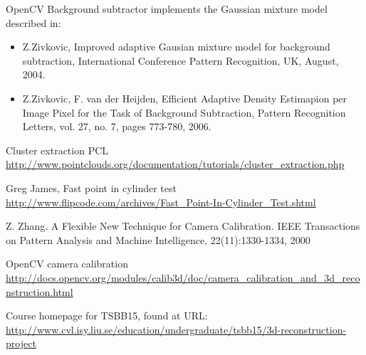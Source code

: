 \documentclass[10pt,a4paper]{article}
\begin{document}



\pagebreak
\tableofcontents
\newpage












	



\begin{thebibliography}{9}

OpenCV Background subtractor implements the Gaussian mixture model described in:
\begin{itemize}
\item Z.Zivkovic, Improved adaptive Gausian mixture model for background subtraction, International Conference Pattern Recognition, UK, August, 2004.
\item Z.Zivkovic, F. van der Heijden, Efficient Adaptive Density Estimapion per Image Pixel for the Task of Background Subtraction, Pattern Recognition Letters, vol. 27, no. 7, pages 773-780, 2006. 
\end{itemize}

Cluster extraction PCL\\
\url{http://www.pointclouds.org/documentation/tutorials/cluster_extraction.php}

Greg James, Fast point in cylinder test\\
\url{http://www.flipcode.com/archives/Fast_Point-In-Cylinder_Test.shtml}

Z. Zhang. A Flexible New Technique for Camera Calibration. IEEE Transactions on Pattern Analysis and Machine Intelligence, 22(11):1330-1334, 2000

OpenCV camera calibration\\
\url{http://docs.opencv.org/modules/calib3d/doc/camera_calibration_and_3d_reconstruction.html}

Course homepage for TSBB15, found at URL:
\url{http://www.cvl.isy.liu.se/education/undergraduate/tsbb15/3d-reconstruction-project}

\end{thebibliography}

\end{document}
